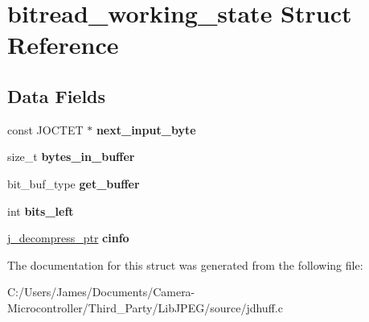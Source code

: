 \hypertarget{structbitread__working__state}{}\section{bitread\+\_\+working\+\_\+state Struct Reference}
\label{structbitread__working__state}
\subsection*{Data Fields}
\begin{DoxyCompactItemize}
\item 
\mbox{\label{structbitread__working__state_aa78a812bda3e8a22f7e8d1df83014883}} 
const J\+O\+C\+T\+ET $\ast$ {\bfseries next\+\_\+input\+\_\+byte}
\item 
\mbox{\label{structbitread__working__state_a4c2fa4f6d7fbd202e084c45bde590a41}} 
size\+\_\+t {\bfseries bytes\+\_\+in\+\_\+buffer}
\item 
\mbox{\label{structbitread__working__state_a9bcfab076ba6e1ababeab060af4e3462}} 
bit\+\_\+buf\+\_\+type {\bfseries get\+\_\+buffer}
\item 
\mbox{\label{structbitread__working__state_aa41e533cd200843c1653b1b9e7285152}} 
int {\bfseries bits\+\_\+left}
\item 
\mbox{\label{structbitread__working__state_a9cc55bbc1878f7cc4a883920534490dc}} 
\hyperlink{structjpeg__decompress__struct}{j\+\_\+decompress\+\_\+ptr} {\bfseries cinfo}
\end{DoxyCompactItemize}


The documentation for this struct was generated from the following file\+:\begin{DoxyCompactItemize}
\item 
C\+:/\+Users/\+James/\+Documents/\+Camera-\/\+Microcontroller/\+Third\+\_\+\+Party/\+Lib\+J\+P\+E\+G/source/jdhuff.\+c\end{DoxyCompactItemize}
